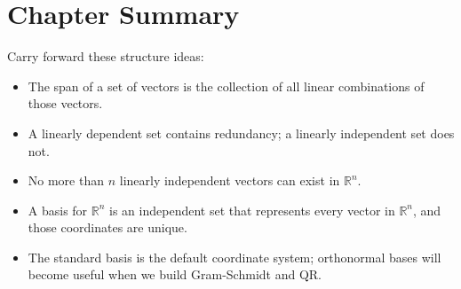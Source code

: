 \section{Chapter Summary}
\label{mf:linear-independence-summary}

Carry forward these structure ideas:
\begin{itemize}
    \item The span of a set of vectors is the collection of all linear combinations of those vectors.
    \item A linearly dependent set contains redundancy; a linearly independent set does not.
    \item No more than \(n\) linearly independent vectors can exist in \(\mathbb{R}^n\).
    \item A basis for \(\mathbb{R}^n\) is an independent set that represents every vector in \(\mathbb{R}^n\), and those coordinates are unique.
    \item The standard basis is the default coordinate system; orthonormal bases will become useful when we build Gram-Schmidt and QR.
\end{itemize}
